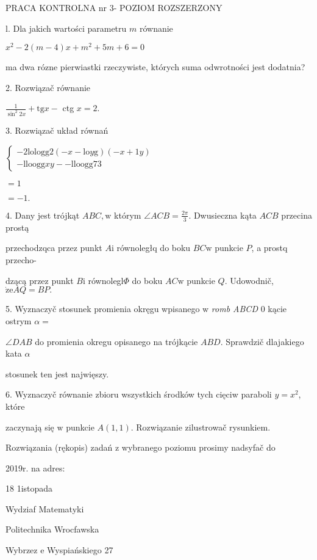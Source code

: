 \documentclass[a4paper,12pt]{article}
\begin{document}
PRACA KONTROLNA nr 3- POZIOM ROZSZERZONY

l. Dla jakich wartości parametru $m$ równanie

$x^{2}-2(m-4)x+m^{2}+5m+6=0$

ma dwa rózne pierwiastki rzeczywiste, których suma odwrotności jest dodatnia?

2. Rozwiązač równanie

$\displaystyle \frac{1}{\sin^{2}2x}+\mathrm{t}\mathrm{g}x-$ ctg $x=2.$

3. Rozwiązač układ równań

$\left\{\begin{array}{l}
- 2\mathrm{l}\mathrm{o}\mathrm{l}\mathrm{o}\mathrm{g}\mathrm{g}2(- x- \mathrm{l}\mathrm{o}y\mathrm{g})(- x+1y)\\
- \mathrm{l}\mathrm{l}\mathrm{o}\mathrm{o}\mathrm{g}\mathrm{g}xy-- \mathrm{l}\mathrm{l}\mathrm{o}\mathrm{o}\mathrm{g}\mathrm{g}73
\end{array}\right.$

$=1$

$=-1.$

4. Dany jest trójkąt $ABC, \mathrm{w}$ którym $\displaystyle \angle ACB=\frac{2\pi}{3}$. Dwusieczna kąta $ACB$ przecina prostą

przechodzqca przez punkt $A\mathrm{i}$ równoległq do boku $BC\mathrm{w}$ punkcie $P$, a prostq przecho-

dzącą przez punkt $B\mathrm{i}$ równolegl$\Phi$ do boku $AC\mathrm{w}$ punkcie $Q$. Udowodnič, $\dot{\mathrm{z}}\mathrm{e}AQ=BP.$

5. Wyznaczyč stosunek promienia okręgu wpisanego $\mathrm{w}$ {\it romb ABCD} $0$ kącie ostrym $\alpha=$

$\angle DAB$ do promienia okregu opisanego na trójkącie $ABD$. Sprawdzič dlajakiego kata $\alpha$

stosunek ten jest najwięszy.

6. Wyznaczyč równanie zbioru wszystkich środków tych cięciw paraboli $y = x^{2}$, które

zaczynają się $\mathrm{w}$ punkcie $A(1,1)$. Rozwiązanie zilustrowač rysunkiem.

Rozwiązania (rękopis) zadań z wybranego poziomu prosimy nadsyfač do

2019r. na adres:

18 1istopada

Wydziaf Matematyki

Politechnika Wrocfawska

Wybrzez $\mathrm{e}$ Wyspiańskiego 27
\end{document}
